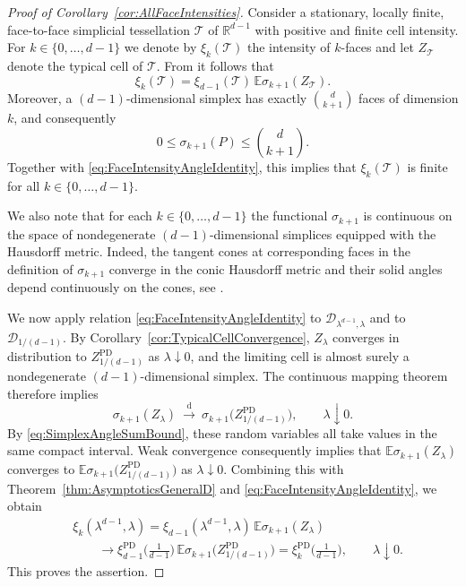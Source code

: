 \documentclass[11pt,a4paper]{article}
\theoremstyle{plain}
\theoremstyle{definition}
\theoremstyle{remark}
\def\EE{\mathbb{E}}
\def\RR{\mathbb{R}}
\def\cD{\mathcal{D}}
\def\cT{\mathcal{T}}
\begin{document}
\begin{proof}[Proof of Corollary~\ref{cor:AllFaceIntensities}] 
Consider a stationary, locally finite, face-to-face simplicial tessellation $\cT$ of $\RR^{d-1}$ with positive and finite cell intensity. For $k\in\{0,\ldots,d-1\}$ we denote by $\xi_k(\cT)$ the intensity of $k$-faces and let $Z_{\cT}$ denote the typical cell of $\cT$. From \cite[Theorem~10.1.3]{SW} it follows that
\begin{equation}\label{eq:FaceIntensityAngleIdentity}
    \xi_k(\cT)
    =\xi_{d-1}(\cT)\,
    \EE\sigma_{k+1}(Z_{\cT}).
\end{equation}
Moreover, a
$(d-1)$-dimensional simplex has exactly $\binom{d}{k+1}$
faces of dimension $k$, and consequently
\begin{equation}\label{eq:SimplexAngleSumBound}
    0\leq\sigma_{k+1}(P)\leq\binom{d}{k+1}.
\end{equation}
Together with \eqref{eq:FaceIntensityAngleIdentity}, this implies that $\xi_k(\cT)$ is finite for all $k\in\{0,\ldots,d-1\}$.

We also note that for each $k\in\{0,\ldots,d-1\}$ the functional $\sigma_{k+1}$ is continuous on the space
of nondegenerate $(d-1)$-dimensional simplices equipped with
the Hausdorff metric. Indeed, the tangent cones at corresponding faces in the definition of $\sigma_{k+1}$ converge
in the conic Hausdorff metric and their solid angles depend
continuously on the cones, see \cite[Proposition~8.2(2)]{MT14}.

We now apply relation \eqref{eq:FaceIntensityAngleIdentity} to
$\cD_{\lambda^{d-1},\lambda}$ and to
$\cD_{1/(d-1)}$. By Corollary~\ref{cor:TypicalCellConvergence}, $Z_\lambda$ converges in distribution to $Z^{\operatorname{PD}}_{1/(d-1)}$ as $\lambda\downarrow0$, and the limiting cell is almost surely a nondegenerate
$(d-1)$-dimensional simplex. The continuous mapping theorem
therefore implies
\[
    \sigma_{k+1}(Z_\lambda)
    \ \xrightarrow{\mathrm d}\
    \sigma_{k+1}\bigl(Z^{\operatorname{PD}}_{1/(d-1)}\bigr),\qquad\lambda\downarrow0.
\]
By \eqref{eq:SimplexAngleSumBound}, these random variables
all take values in the same compact interval. Weak
convergence consequently implies that $\EE\sigma_{k+1}(Z_\lambda)$ converges to $\EE\sigma_{k+1}\bigl(Z^{\operatorname{PD}}_{1/(d-1)}\bigr)$ as $\lambda\downarrow0$.
Combining this with
Theorem~\ref{thm:AsymptoticsGeneralD} and
\eqref{eq:FaceIntensityAngleIdentity}, we obtain
\[
\begin{aligned}
    &\xi_k(\lambda^{d-1},\lambda)
    =
    \xi_{d-1}(\lambda^{d-1},\lambda)\,
    \EE\sigma_{k+1}(Z_\lambda)\\
    &\qquad\longrightarrow
    \xi_{d-1}^{\operatorname{PD}}
    \Big(\frac{1}{d-1}\Big)\,
    \EE\sigma_{k+1}
    \bigl(Z^{\operatorname{PD}}_{1/(d-1)}\bigr)
    =\xi_k^{\operatorname{PD}}
    \Big(\frac{1}{d-1}\Big),\qquad\lambda\downarrow0.
\end{aligned}
\]
This proves the assertion.
\end{proof}
\end{document}
